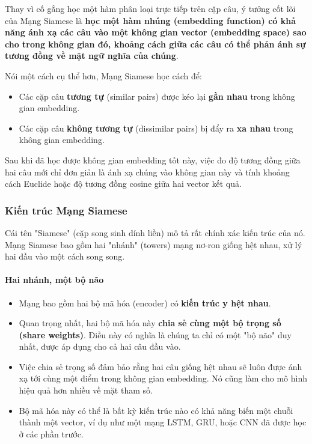 Thay vì cố gắng học một hàm phân loại trực tiếp trên cặp câu, ý tưởng cốt lõi của Mạng Siamese là \textbf{học một hàm nhúng (embedding function) có khả năng ánh xạ các câu vào một không gian vector (embedding space) sao cho trong không gian đó, khoảng cách giữa các câu có thể phản ánh sự tương đồng về mặt ngữ nghĩa của chúng}.

Nói một cách cụ thể hơn, Mạng Siamese học cách để:
\begin{itemize}
    \item Các cặp câu \textbf{tương tự} (similar pairs) được kéo lại \textbf{gần nhau} trong không gian embedding.
    \item Các cặp câu \textbf{không tương tự} (dissimilar pairs) bị đẩy ra \textbf{xa nhau} trong không gian embedding.
\end{itemize}

Sau khi đã học được không gian embedding tốt này, việc đo độ tương đồng giữa hai câu mới chỉ đơn giản là ánh xạ chúng vào không gian này và tính khoảng cách Euclide hoặc độ tương đồng cosine giữa hai vector kết quả.

\subsubsection{Kiến trúc Mạng Siamese}
\label{ssec:siamese_architecture}

Cái tên "Siamese" (cặp song sinh dính liền) mô tả rất chính xác kiến trúc của nó. Mạng Siamese bao gồm hai "nhánh" (towers) mạng nơ-ron giống hệt nhau, xử lý hai đầu vào một cách song song.

\paragraph{Hai nhánh, một bộ não}
\begin{itemize}
    \item Mạng bao gồm hai bộ mã hóa (encoder) có \textbf{kiến trúc y hệt nhau}.
    \item Quan trọng nhất, hai bộ mã hóa này \textbf{chia sẻ cùng một bộ trọng số (share weights)}. Điều này có nghĩa là chúng ta chỉ có một "bộ não" duy nhất, được áp dụng cho cả hai câu đầu vào.
    \item Việc chia sẻ trọng số đảm bảo rằng hai câu giống hệt nhau sẽ luôn được ánh xạ tới cùng một điểm trong không gian embedding. Nó cũng làm cho mô hình hiệu quả hơn nhiều về mặt tham số.
    \item Bộ mã hóa này có thể là bất kỳ kiến trúc nào có khả năng biến một chuỗi thành một vector, ví dụ như một mạng LSTM, GRU, hoặc CNN đã được học ở các phần trước.
\end{itemize}

